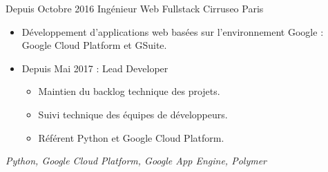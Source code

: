 \cventry
    {Depuis Octobre 2016}
    {Ingénieur Web Fullstack}
    {}
    {Cirruseo}
    {Paris}
    {
        \begin{itemize}
            \item Développement d'applications web basées sur l'environnement Google : Google Cloud Platform et GSuite.
            \item Depuis Mai 2017 : Lead Developer
            \begin{itemize}
                \item Maintien du backlog technique des projets.
                \item Suivi technique des équipes de développeurs.
                \item Référent Python et Google Cloud Platform.
            \end{itemize}
        \end{itemize}
        \textit{Python, Google Cloud Platform, Google App Engine, Polymer}
    }
\vspace*{0.2cm}
